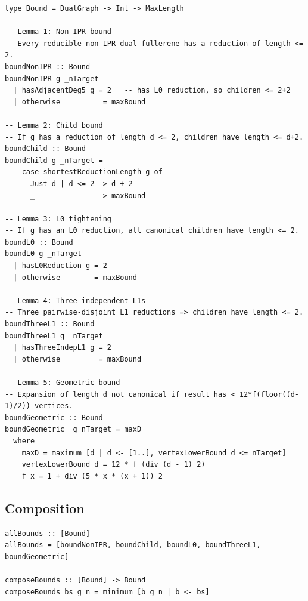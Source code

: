 \documentclass[11pt,a4paper]{article}
\theoremstyle{definition}
\begin{document}
\begin{lstlisting}
type Bound = DualGraph -> Int -> MaxLength

-- Lemma 1: Non-IPR bound
-- Every reducible non-IPR dual fullerene has a reduction of length <= 2.
boundNonIPR :: Bound
boundNonIPR g _nTarget
  | hasAdjacentDeg5 g = 2   -- has L0 reduction, so children <= 2+2
  | otherwise          = maxBound

-- Lemma 2: Child bound
-- If g has a reduction of length d <= 2, children have length <= d+2.
boundChild :: Bound
boundChild g _nTarget =
    case shortestReductionLength g of
      Just d | d <= 2 -> d + 2
      _               -> maxBound

-- Lemma 3: L0 tightening
-- If g has an L0 reduction, all canonical children have length <= 2.
boundL0 :: Bound
boundL0 g _nTarget
  | hasL0Reduction g = 2
  | otherwise        = maxBound

-- Lemma 4: Three independent L1s
-- Three pairwise-disjoint L1 reductions => children have length <= 2.
boundThreeL1 :: Bound
boundThreeL1 g _nTarget
  | hasThreeIndepL1 g = 2
  | otherwise         = maxBound

-- Lemma 5: Geometric bound
-- Expansion of length d not canonical if result has < 12*f(floor((d-1)/2)) vertices.
boundGeometric :: Bound
boundGeometric _g nTarget = maxD
  where
    maxD = maximum [d | d <- [1..], vertexLowerBound d <= nTarget]
    vertexLowerBound d = 12 * f (div (d - 1) 2)
    f x = 1 + div (5 * x * (x + 1)) 2
\end{lstlisting}

\subsection{Composition}

\begin{lstlisting}
allBounds :: [Bound]
allBounds = [boundNonIPR, boundChild, boundL0, boundThreeL1, boundGeometric]

composeBounds :: [Bound] -> Bound
composeBounds bs g n = minimum [b g n | b <- bs]
\end{lstlisting}
\end{document}
